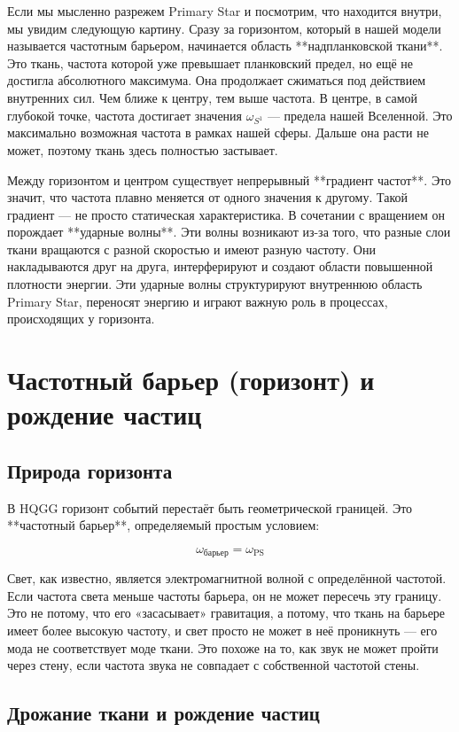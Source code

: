 \documentclass[12pt,a4paper]{article}
\begin{document}
Если мы мысленно разрежем Primary Star и посмотрим, что находится внутри, мы увидим следующую картину. Сразу за горизонтом, который в нашей модели называется частотным барьером, начинается область **надпланковской ткани**. Это ткань, частота которой уже превышает планковский предел, но ещё не достигла абсолютного максимума. Она продолжает сжиматься под действием внутренних сил. Чем ближе к центру, тем выше частота. В центре, в самой глубокой точке, частота достигает значения \(\omega_{S^1}\) — предела нашей Вселенной. Это максимально возможная частота в рамках нашей сферы. Дальше она расти не может, поэтому ткань здесь полностью застывает.

Между горизонтом и центром существует непрерывный **градиент частот**. Это значит, что частота плавно меняется от одного значения к другому. Такой градиент — не просто статическая характеристика. В сочетании с вращением он порождает **ударные волны**. Эти волны возникают из-за того, что разные слои ткани вращаются с разной скоростью и имеют разную частоту. Они накладываются друг на друга, интерферируют и создают области повышенной плотности энергии. Эти ударные волны структурируют внутреннюю область Primary Star, переносят энергию и играют важную роль в процессах, происходящих у горизонта.

\section{Частотный барьер (горизонт) и рождение частиц}

\subsection{Природа горизонта}

В HQGG горизонт событий перестаёт быть геометрической границей. Это **частотный барьер**, определяемый простым условием:

\[
\omega_{\text{барьер}} = \omega_{\text{PS}}
\]

Свет, как известно, является электромагнитной волной с определённой частотой. Если частота света меньше частоты барьера, он не может пересечь эту границу. Это не потому, что его «засасывает» гравитация, а потому, что ткань на барьере имеет более высокую частоту, и свет просто не может в неё проникнуть — его мода не соответствует моде ткани. Это похоже на то, как звук не может пройти через стену, если частота звука не совпадает с собственной частотой стены.

\subsection{Дрожание ткани и рождение частиц}
\end{document}
